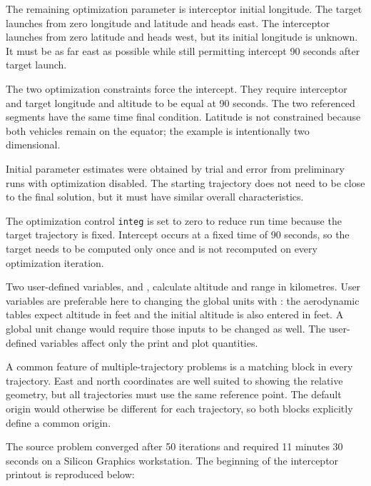 The remaining optimization parameter is interceptor initial longitude.  The target
launches from zero longitude and latitude and heads east.  The interceptor launches
from zero latitude and heads west, but its initial longitude is unknown.  It must be as
far east as possible while still permitting intercept 90 seconds after target launch.

The two optimization constraints force the intercept.  They require interceptor and
target longitude and altitude to be equal at 90 seconds.  The two referenced segments
have the same time final condition.  Latitude is not constrained because both vehicles
remain on the equator; the example is intentionally two dimensional.

Initial parameter estimates were obtained by trial and error from preliminary runs
with optimization disabled.  The starting trajectory does not need to be close to the
final solution, but it must have similar overall characteristics.

The optimization control \texttt{integ} is set to zero to reduce run time because the
target trajectory is fixed.  Intercept occurs at a fixed time of 90 seconds, so the target
needs to be computed only once and is not recomputed on every optimization
iteration.


Two user-defined variables,  and , calculate
altitude and range in kilometres.  User variables are preferable here to changing the
global units with : the aerodynamic tables expect altitude
in feet and the initial altitude is also entered in feet.  A global unit change would
require those inputs to be changed as well.  The user-defined variables affect only
the print and plot quantities.

A common feature of multiple-trajectory problems is a matching
 block in every trajectory.  East and north coordinates are
well suited to showing the relative geometry, but all trajectories must use the same
reference point.  The default origin would otherwise be different for each trajectory,
so both blocks explicitly define a common origin.


The source problem converged after 50 iterations and required 11 minutes 30 seconds
on a Silicon Graphics workstation.  The beginning of the interceptor printout is
reproduced below:

\begin{center}
\begin{minipage}{0.98\linewidth}

\end{minipage}
\end{center}

